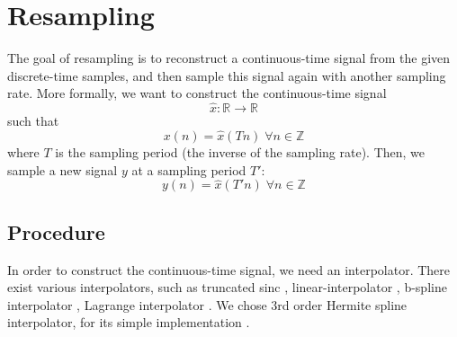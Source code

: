 \documentclass[letterpaper]{article}
\theoremstyle{definition}
\theoremstyle{remark}
\begin{document}
\section{Resampling}
The goal of resampling is to reconstruct a continuous-time signal from the given
discrete-time samples, and then sample this signal again with another sampling
rate. More formally, we want to construct the continuous-time signal
\begin{equation}\hat x:\mathbb{R}\to\mathbb{R}\end{equation}
such that
\begin{equation}x(n) = \hat x(Tn) \;\forall n\in\mathbb{Z}\end{equation}
where \(T\) is the sampling period (the inverse of the sampling rate). Then, we
sample a new signal \(y\) at a sampling period \(T'\):
\begin{equation*}y(n) = \hat x(T'n) \;\forall n\in\mathbb{Z}\end{equation*}

\subsection{Procedure}
In order to construct the continuous-time signal, we need an interpolator. There
exist various interpolators, such as truncated sinc
\citep{duncan1988fundamentals, rossum1989an}, linear-interpolator
\citep{rossum1993}, b-spline interpolator \citep{Sankar1998},
Lagrange interpolator \citep{Schafer1973}. We chose 3rd order Hermite spline
interpolator, for its simple implementation \citep{Grisoni97anhermitian}.
\end{document}
